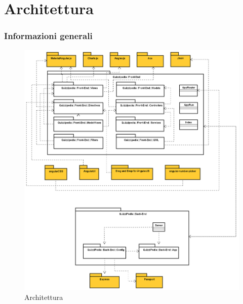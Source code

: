 \newpage

\section{Architettura}

\subsubsection{Informazioni generali}
\label{Architettura}
\begin{figure}[ht]
	\centering
	\includegraphics[scale=0.35]{UML/Package/QuizziPedia.png}
	\caption{Architettura}
\end{figure}
\FloatBarrier
